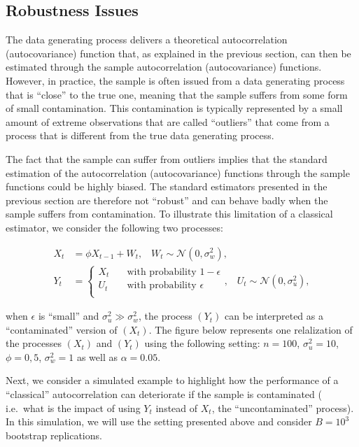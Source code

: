 \documentclass[]{book}
\theoremstyle{definition}
\theoremstyle{definition}
\theoremstyle{definition}
\theoremstyle{remark}
\begin{document}
{\hypertarget{robustness-issues}{%
\subsection{Robustness Issues}\label{robustness-issues}}

The data generating process delivers a theoretical autocorrelation
(autocovariance) function that, as explained in the previous section,
can then be estimated through the sample autocorrelation
(autocovariance) functions. However, in practice, the sample is often
issued from a data generating process that is ``close'' to the true one,
meaning that the sample suffers from some form of small contamination.
This contamination is typically represented by a small amount of extreme
observations that are called ``outliers'' that come from a process that
is different from the true data generating process.

The fact that the sample can suffer from outliers implies that the
standard estimation of the autocorrelation (autocovariance) functions
through the sample functions could be highly biased. The standard
estimators presented in the previous section are therefore not
``robust'' and can behave badly when the sample suffers from
contamination. To illustrate this limitation of a classical estimator,
we consider the following two processes:

\[ 
    \begin{aligned}
    X_t &= \phi X_{t-1} + W_t, \;\;\; W_t \sim \mathcal{N}(0,\sigma_w^2),\\
    Y_t &= \begin{cases}
    X_t       & \quad \text{with probability } 1 - \epsilon\\
    U_t  & \quad \text{with probability } \epsilon\\
    \end{cases}, \;\;\; U_t \sim \mathcal{N}(0,\sigma_u^2),
    \end{aligned}
\]

when \(\epsilon\) is ``small'' and \(\sigma_u^2 \gg \sigma_w^2\), the
process \((Y_t)\) can be interpreted as a ``contaminated'' version of
\((X_t)\). The figure below represents one relalization of the processes
\((X_t)\) and \((Y_t)\) using the following setting: \(n = 100\),
\(\sigma_u^2 = 10\), \(\phi = 0,5\), \(\sigma_w^2 = 1\) as well as
\(\alpha = 0.05\).

Next, we consider a simulated example to highlight how the performance
of a ``classical'' autocorrelation can deteriorate if the sample is
contaminated ( i.e.~what is the impact of using \(Y_t\) instead of
\(X_t\), the ``uncontaminated'' process). In this simulation, we will
use the setting presented above and consider \(B = 10^3\) bootstrap
replications.

}
\end{document}
